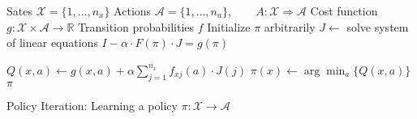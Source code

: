 \documentclass{article}
\begin{document}
\begin{preview}
    \begin{algorithm}[H]
        \begin{algorithmic}
        \Require
        \Statex Sates $\mathcal{X} = \{1, \dots, n_x\}$
        \Statex Actions $\mathcal{A} = \{1, \dots, n_a\},\qquad A: \mathcal{X} \Rightarrow \mathcal{A}$
        \Statex Cost function $g: \mathcal{X} \times \mathcal{A} \rightarrow \mathbb{R}$
        \Statex Transition probabilities $f$
            \State Initialize $\pi$ arbitrarily
                \State $J \gets$ solve system of linear equations $I - \alpha \cdot F(\pi) \cdot J = g(\pi)$

                        \State $Q(x, a) \gets g(x, a) + \alpha \sum_{j=1}^{n_x} f_{xj}(a) \cdot J(j)$
                    \EndFor
                \EndFor
                    \State $\pi(x) \gets \arg \min_a \{Q(x, a)\}$
                \EndFor
            \EndWhile
            \Return $\pi$
        \EndProcedure
        \end{algorithmic}
    \caption{Policy Iteration: Learning a policy $\pi: \mathcal{X} \rightarrow \mathcal{A}$}
    \label{alg:policy-iteration}
    \end{algorithm}
\end{preview}
\end{document}
